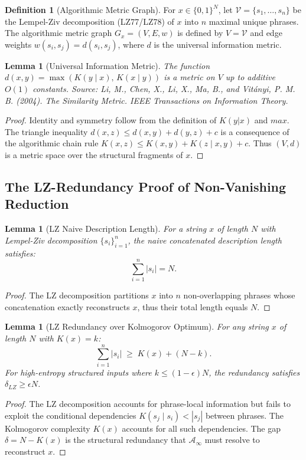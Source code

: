 \documentclass[12pt,a4paper]{article}
\theoremstyle{plain}
\newtheorem{lemma}[theorem]{Lemma}
\theoremstyle{definition}
\newtheorem{definition}[theorem]{Definition}
\begin{document}
\begin{definition}[Algorithmic Metric Graph] \label{def:graph}
For $x \in \{0,1\}^N$, let $\mathcal{V} = \{s_1, \dots, s_n\}$ be the Lempel-Ziv 
decomposition (LZ77/LZ78) of $x$ into $n$ maximal unique phrases. The algorithmic metric 
graph $G_x = (V, E, w)$ is defined by $V = \mathcal{V}$ and edge weights $w(s_i, s_j) = 
d(s_i, s_j)$, where $d$ is the universal information metric.
\end{definition}

\begin{lemma}[Universal Information Metric] \label{lem:metric}
The function $d(x,y) = \max(K(y \mid x),\, K(x \mid y))$ is a metric on $V$ up to additive 
$O(1)$ constants. 
\small{\textit{Source: Li, M., Chen, X., Li, X., Ma, B., and Vit\'anyi, P. M. B. (2004). The Similarity Metric. IEEE Transactions on Information Theory.}}
\end{lemma}
\begin{proof}
Identity and symmetry follow from the definition of $K(y|x)$ and $max$. The triangle 
inequality $d(x, z) \le d(x, y) + d(y, z) + c$ is a consequence of the algorithmic chain 
rule $K(x, z) \le K(x, y) + K(z \mid x, y) + c$. Thus $(V, d)$ is a metric space over the 
structural fragments of $x$.
\end{proof}

\subsection{The LZ-Redundancy Proof of Non-Vanishing Reduction}

\begin{lemma}[LZ Naive Description Length] \label{lem:lz_naive}
For a string $x$ of length $N$ with Lempel-Ziv decomposition $\{s_i\}_{i=1}^n$, the naive 
concatenated description length satisfies:
\begin{equation}
    \sum_{i=1}^{n} |s_i| = N.
\end{equation}
\end{lemma}
\begin{proof}
The LZ decomposition partitions $x$ into $n$ non-overlapping phrases whose concatenation 
exactly reconstructs $x$, thus their total length equals $N$.
\end{proof}

\begin{lemma}[LZ Redundancy over Kolmogorov Optimum] \label{lem:lz_redundancy}
For any string $x$ of length $N$ with $K(x) = k$:
\begin{equation}
    \sum_{i=1}^n |s_i| \;\ge\; K(x) + (N - k).
\end{equation}
For high-entropy structured inputs where $k \le (1-\epsilon)N$, the redundancy satisfies 
$\delta_{LZ} \ge \epsilon N$.
\end{lemma}
\begin{proof}
The LZ decomposition accounts for phrase-local information but fails to exploit the 
conditional dependencies $K(s_j \mid s_i) < |s_j|$ between phrases. The Kolmogorov 
complexity $K(x)$ accounts for all such dependencies. The gap $\delta = N - K(x)$ is the 
structural redundancy that $\mathcal{A}_\infty$ must resolve to reconstruct $x$.
\end{proof}
\end{document}
